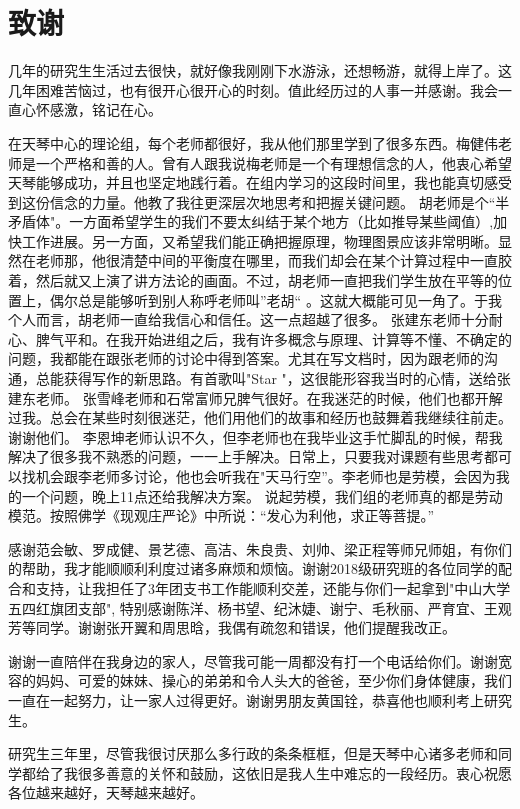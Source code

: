 
\chapter*{致\quad 谢}
几年的研究生生活过去很快，就好像我刚刚下水游泳，还想畅游，就得上岸了。这几年困难苦恼过，也有很开心很开心的时刻。值此经历过的人事一并感谢。我会一直心怀感激，铭记在心。

在天琴中心的理论组，每个老师都很好，我从他们那里学到了很多东西。梅健伟老师是一个严格和善的人。曾有人跟我说梅老师是一个有理想信念的人，他衷心希望天琴能够成功，并且也坚定地践行着。在组内学习的这段时间里，我也能真切感受到这份信念的力量。他教了我往更深层次地思考和把握关键问题。
胡老师是个``半矛盾体"。一方面希望学生的我们不要太纠结于某个地方（比如推导某些阈值）,加快工作进展。另一方面，又希望我们能正确把握原理，物理图景应该非常明晰。显然在老师那，他很清楚中间的平衡度在哪里，而我们却会在某个计算过程中一直胶着，然后就又上演了讲方法论的画面。不过，胡老师一直把我们学生放在平等的位置上，偶尔总是能够听到别人称呼老师叫”老胡“
。这就大概能可见一角了。于我个人而言，胡老师一直给我信心和信任。这一点超越了很多。
张建东老师十分耐心、脾气平和。在我开始进组之后，我有许多概念与原理、计算等不懂、不确定的问题，我都能在跟张老师的讨论中得到答案。尤其在写文档时，因为跟老师的沟通，总能获得写作的新思路。有首歌叫"Star "，这很能形容我当时的心情，送给张建东老师。
张雪峰老师和石常富师兄脾气很好。在我迷茫的时候，他们也都开解过我。总会在某些时刻很迷茫，他们用他们的故事和经历也鼓舞着我继续往前走。谢谢他们。
李恩坤老师认识不久，但李老师也在我毕业这手忙脚乱的时候，帮我解决了很多我不熟悉的问题，一一上手解决。日常上，只要我对课题有些思考都可以找机会跟李老师多讨论，他也会听我在"天马行空”。李老师也是劳模，会因为我的一个问题，晚上11点还给我解决方案。
说起劳模，我们组的老师真的都是劳动模范。按照佛学《现观庄严论》中所说：“发心为利他，求正等菩提。”

感谢范会敏、罗成健、景艺德、高洁、朱良贵、刘帅、梁正程等师兄师姐，有你们的帮助，我才能顺顺利利度过诸多麻烦和烦恼。谢谢2018级研究班的各位同学的配合和支持，让我担任了3年团支书工作能顺利交差，还能与你们一起拿到"中山大学五四红旗团支部", 特别感谢陈洋、杨书望、纪沐婕、谢宁、毛秋丽、严育宜、王观芳等同学。谢谢张开翼和周思晗，我偶有疏忽和错误，他们提醒我改正。

谢谢一直陪伴在我身边的家人，尽管我可能一周都没有打一个电话给你们。谢谢宽容的妈妈、可爱的妹妹、操心的弟弟和令人头大的爸爸，至少你们身体健康，我们一直在一起努力，让一家人过得更好。谢谢男朋友黄国铨，恭喜他也顺利考上研究生。


研究生三年里，尽管我很讨厌那么多行政的条条框框，但是天琴中心诸多老师和同学都给了我很多善意的关怀和鼓励，这依旧是我人生中难忘的一段经历。衷心祝愿各位越来越好，天琴越来越好。